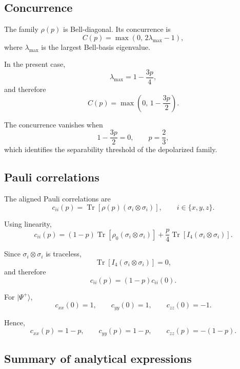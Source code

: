 \documentclass[a4paper]{article}
\begin{document}

\subsection*{Concurrence}

The family \( \rho(p) \) is Bell-diagonal. Its concurrence is
\[
C(p)
=
\max\left(0,\,2\lambda_{\max}-1\right),
\]
where \( \lambda_{\max} \) is the largest Bell-basis eigenvalue.

In the present case,
\[
\lambda_{\max}
=
1-\frac{3p}{4},
\]
and therefore
\[
C(p)
=
\max\left(0,\,1-\frac{3p}{2}\right).
\]

The concurrence vanishes when
\[
1-\frac{3p}{2}=0,
\qquad
p=\frac{2}{3},
\]
which identifies the separability threshold of the depolarized family.


\subsection*{Pauli correlations}

The aligned Pauli correlations are
\[
c_{ii}(p)
=
\operatorname{Tr}\!\left[\rho(p)(\sigma_i\otimes\sigma_i)\right],
\qquad
i\in\{x,y,z\}.
\]

Using linearity,
\[
c_{ii}(p)
=
(1-p)\operatorname{Tr}\!\left[\rho_0(\sigma_i\otimes\sigma_i)\right]
+
\frac{p}{4}\operatorname{Tr}\!\left[I_4(\sigma_i\otimes\sigma_i)\right].
\]

Since \( \sigma_i\otimes\sigma_i \) is traceless,
\[
\operatorname{Tr}\!\left[I_4(\sigma_i\otimes\sigma_i)\right]
=
0,
\]
and therefore
\[
c_{ii}(p)=(1-p)c_{ii}(0).
\]

For \( |\Psi^+\rangle \),
\[
c_{xx}(0)=1,
\qquad
c_{yy}(0)=1,
\qquad
c_{zz}(0)=-1.
\]

Hence,
\[
c_{xx}(p)=1-p,
\qquad
c_{yy}(p)=1-p,
\qquad
c_{zz}(p)=-(1-p).
\]


\subsection*{Summary of analytical expressions}
\end{document}
